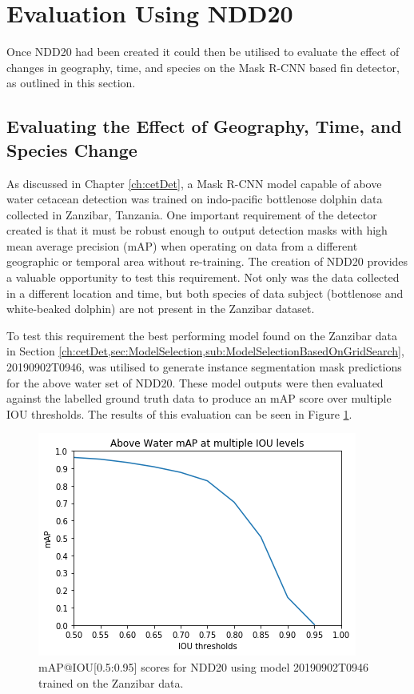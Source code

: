 \section{Evaluation Using NDD20}\label{ch:NDD,sec:EvalUsingNDD20}

Once NDD20 had been created it could then be utilised to evaluate the effect of changes in geography, time, and species on the Mask R-CNN based fin detector, as outlined in this section.

\subsection{Evaluating the Effect of Geography, Time, and Species Change}\label{ch:NDD,sec:EvalUsingNDD20,subsec:geographyTimeSpeciesChange}

As discussed in Chapter \ref{ch:cetDet}, a Mask R-CNN model capable of above water cetacean detection was trained on indo-pacific bottlenose dolphin data collected in Zanzibar, Tanzania. One important requirement of the detector created is that it must be robust enough to output detection masks with high mean average precision (mAP) when operating on data from a different geographic or temporal area without re-training. The creation of NDD20 provides a valuable opportunity to test this requirement. Not only was the data collected in a different location and time, but both species of data subject (bottlenose and white-beaked dolphin) are not present in the Zanzibar dataset.  

To test this requirement the best performing model found on the Zanzibar data in Section \ref{ch:cetDet,sec:ModelSelection,sub:ModelSelectionBasedOnGridSearch}, 20190902T0946, was utilised to generate instance segmentation mask predictions for the above water set of NDD20. These model outputs were then evaluated against the labelled ground truth data to produce an mAP score over multiple IOU thresholds. The results of this evaluation can be seen in Figure \ref{fig:aw-mAP-IOU}.

\begin{figure}
	\begin{center}
		\includegraphics[scale=0.7]{Chapter4/figs/aw-mAP-IOU.png}
	\end{center}
	\caption{mAP@IOU[0.5:0.95] scores for NDD20 using model 20190902T0946 trained on the Zanzibar data.}
	\label{fig:aw-mAP-IOU}
\end{figure}


